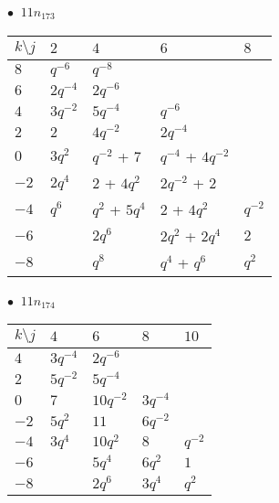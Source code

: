 %
\begin{minipage}{\linewidth}
$\bullet\ $ $11n_{173}$ \vspace{0.5em} \\
\begin{tabular}{l|llll}
$k \setminus j$ & $2$ & $4$ & $6$ & $8$ \\
\hline
$8$ & $q^{-6}$ & $q^{-8}$ &  &  \\
$6$ & $2q^{-4}$ & $2q^{-6}$ &  &  \\
$4$ & $3q^{-2}$ & $5q^{-4}$ & $q^{-6}$ &  \\
$2$ & $2$ & $4q^{-2}$ & $2q^{-4}$ &  \\
$0$ & $3q^{2}$ & $q^{-2}$ + $7$ & $q^{-4}$ + $4q^{-2}$ &  \\
$-2$ & $2q^{4}$ & $2$ + $4q^{2}$ & $2q^{-2}$ + $2$ &  \\
$-4$ & $q^{6}$ & $q^{2}$ + $5q^{4}$ & $2$ + $4q^{2}$ & $q^{-2}$ \\
$-6$ &  & $2q^{6}$ & $2q^{2}$ + $2q^{4}$ & $2$ \\
$-8$ &  & $q^{8}$ & $q^{4}$ + $q^{6}$ & $q^{2}$ \\
\end{tabular}
\vspace{2em}
\end{minipage}
%
\begin{minipage}{\linewidth}
$\bullet\ $ $11n_{174}$ \vspace{0.5em} \\
\begin{tabular}{l|llll}
$k \setminus j$ & $4$ & $6$ & $8$ & $10$ \\
\hline
$4$ & $3q^{-4}$ & $2q^{-6}$ &  &  \\
$2$ & $5q^{-2}$ & $5q^{-4}$ &  &  \\
$0$ & $7$ & $10q^{-2}$ & $3q^{-4}$ &  \\
$-2$ & $5q^{2}$ & $11$ & $6q^{-2}$ &  \\
$-4$ & $3q^{4}$ & $10q^{2}$ & $8$ & $q^{-2}$ \\
$-6$ &  & $5q^{4}$ & $6q^{2}$ & $1$ \\
$-8$ &  & $2q^{6}$ & $3q^{4}$ & $q^{2}$ \\
\end{tabular}
\vspace{2em}
\end{minipage}
%
